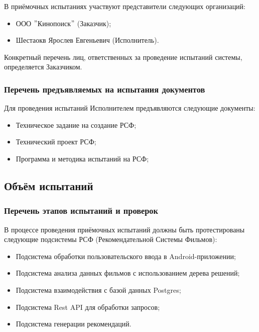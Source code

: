 В приёмочных испытаниях участвуют представители следующих организаций:

\begin{itemize}
	\item ООО \("\)Кинопоиск\("\) (Заказчик);
	\item Шестаокв Ярослев Евгеньевич (Исполнитель).
\end{itemize}

Конкретный перечень лиц, ответственных за проведение испытаний системы, определяется Заказчиком.

\subsubsection{Перечень предъявляемых на испытания документов}

Для проведения испытаний Исполнителем предъявляются следующие документы:

\begin{itemize}
	\item Техническое задание на создание РСФ;
	\item Технический проект РСФ;
	\item Программа и методика испытаний на РСФ;
\end{itemize}
\subsection{Объём испытаний}

\subsubsection{Перечень этапов испытаний и проверок}

В процессе проведения приёмочных испытаний должны быть протестированы следующие подсистемы РСФ (Рекомендательной Системы Фильмов):

\begin{itemize}
	\item Подсистема обработки пользовательского ввода в Android-приложении;
	\item Подсистема анализа данных фильмов с использованием дерева решений;
	\item Подсистема взаимодействия с базой данных Postgres;
	\item Подсистема Rest API для обработки запросов;
	\item Подсистема генерации рекомендаций.
\end{itemize}


